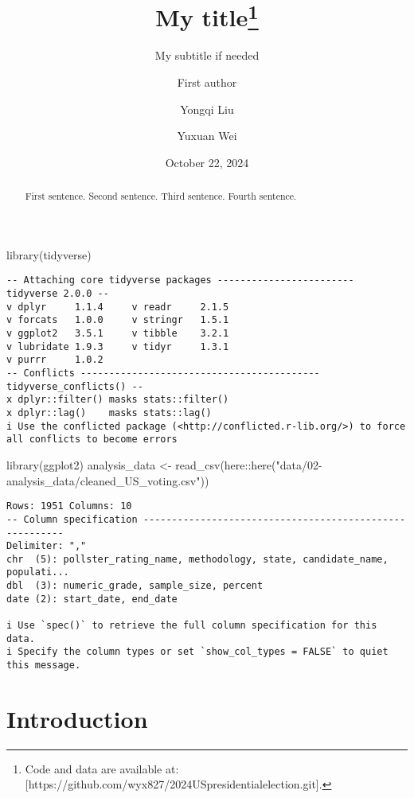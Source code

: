 \documentclass[
  letterpaper,
  DIV=11,
  numbers=noendperiod]{scrartcl}
\title{My title\thanks{Code and data are available at:
{[}https://github.com/wyx827/2024USpresidentialelection.git{]}.}}
\subtitle{My subtitle if needed}
\author{First author \and Yongqi Liu \and Yuxuan Wei}
\date{October 22, 2024}
\newenvironment{Shaded}{\begin{snugshade}}{\end{snugshade}}
\newcommand{\FunctionTok}[1]{\textcolor[rgb]{0.28,0.35,0.67}{#1}}
\newcommand{\NormalTok}[1]{\textcolor[rgb]{0.00,0.23,0.31}{#1}}
\newcommand{\OtherTok}[1]{\textcolor[rgb]{0.00,0.23,0.31}{#1}}
\newcommand{\SpecialCharTok}[1]{\textcolor[rgb]{0.37,0.37,0.37}{#1}}
\newcommand{\StringTok}[1]{\textcolor[rgb]{0.13,0.47,0.30}{#1}}
\begin{document}
\maketitle
\begin{abstract}
First sentence. Second sentence. Third sentence. Fourth sentence.
\end{abstract}


\begin{Shaded}
\begin{Highlighting}[]
\FunctionTok{library}\NormalTok{(tidyverse)}
\end{Highlighting}
\end{Shaded}

\begin{verbatim}
-- Attaching core tidyverse packages ------------------------ tidyverse 2.0.0 --
v dplyr     1.1.4     v readr     2.1.5
v forcats   1.0.0     v stringr   1.5.1
v ggplot2   3.5.1     v tibble    3.2.1
v lubridate 1.9.3     v tidyr     1.3.1
v purrr     1.0.2     
-- Conflicts ------------------------------------------ tidyverse_conflicts() --
x dplyr::filter() masks stats::filter()
x dplyr::lag()    masks stats::lag()
i Use the conflicted package (<http://conflicted.r-lib.org/>) to force all conflicts to become errors
\end{verbatim}

\begin{Shaded}
\begin{Highlighting}[]
\FunctionTok{library}\NormalTok{(ggplot2)}
\NormalTok{analysis\_data }\OtherTok{\textless{}{-}} \FunctionTok{read\_csv}\NormalTok{(here}\SpecialCharTok{::}\FunctionTok{here}\NormalTok{(}\StringTok{"data/02{-}analysis\_data/cleaned\_US\_voting.csv"}\NormalTok{))}
\end{Highlighting}
\end{Shaded}

\begin{verbatim}
Rows: 1951 Columns: 10
-- Column specification --------------------------------------------------------
Delimiter: ","
chr  (5): pollster_rating_name, methodology, state, candidate_name, populati...
dbl  (3): numeric_grade, sample_size, percent
date (2): start_date, end_date

i Use `spec()` to retrieve the full column specification for this data.
i Specify the column types or set `show_col_types = FALSE` to quiet this message.
\end{verbatim}

\section{Introduction}\label{introduction}
\end{document}
